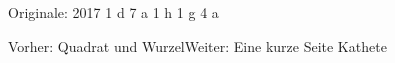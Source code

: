 \documentclass[11pt]{article}
\begin{document}
\par\vfill\noindent\begin{minipage}{\linewidth}{\scriptsize\color{mbgrau}Originale: 2017 \textperiodcentered{} 1 \textperiodcentered{} d  \textperiodcentered{} 7 \textperiodcentered{} a  \textperiodcentered{} 1 \textperiodcentered{} h  \textperiodcentered{} 1 \textperiodcentered{} g  \textperiodcentered{} 4 \textperiodcentered{} a\par}\smallskip
{\footnotesize Vorher: Quadrat und Wurzel\quad\textbullet\quad Weiter: Eine kurze Seite \textperiodcentered{} Kathete\par}\end{minipage}
\end{document}
